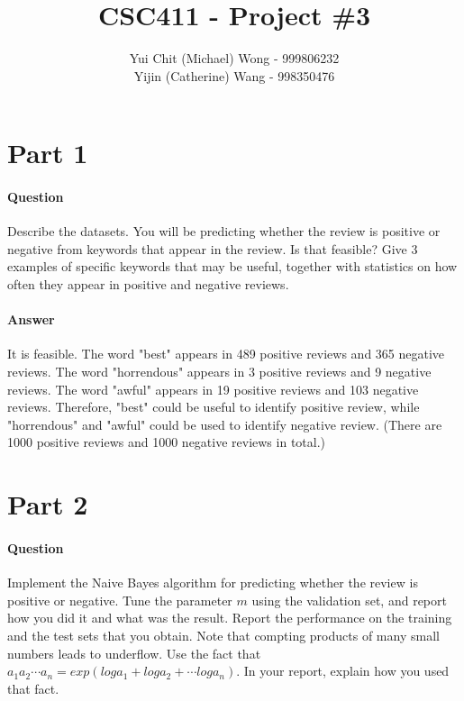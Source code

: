 \documentclass[11pt,twoside]{article}
\begin{document}
\title{CSC411 - Project \#3}
\author{Yui Chit (Michael) Wong - 999806232\\Yijin (Catherine) Wang - 998350476}
\maketitle

\clearpage

\section*{Part 1}
\paragraph{Question}
Describe the datasets. You will be predicting whether the review is positive or negative from keywords that appear in the review. Is that feasible? Give 3 examples of specific keywords that may be useful, together with statistics on how often they appear in positive and negative reviews.

\paragraph{Answer}
It is feasible. The word "best" appears in 489 positive reviews and 365 negative reviews. The word "horrendous" appears in 3 positive reviews and 9 negative reviews. The word "awful" appears in 19 positive reviews and 103 negative reviews. Therefore, "best" could be useful to identify positive review, while "horrendous" and "awful" could be used to identify negative review.  (There are 1000 positive reviews and 1000 negative reviews in total.)

\clearpage

\section*{Part 2}

\paragraph{Question}
Implement the Naive Bayes algorithm for predicting whether the review is positive or negative. Tune the parameter $m$ using the validation set, and report how you did it and what was the result. Report the performance on the training and the test sets that you obtain. Note that compting products of many small numbers leads to underflow. Use the fact that $a_1a_2\cdots a_n = exp(loga_1 + loga_2 + \cdots loga_n)$. In your report, explain how you used that fact.
\end{document}
